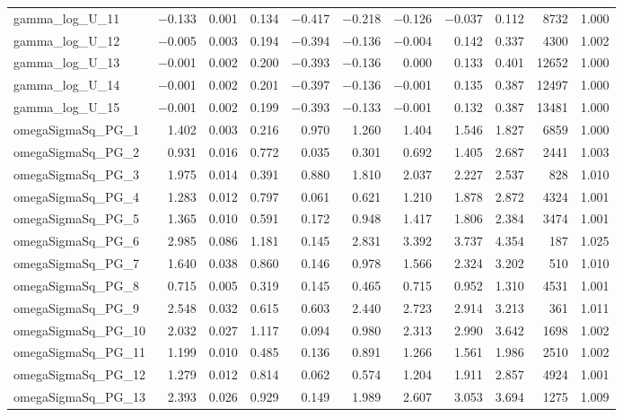 \documentclass[12pt]{article}
\begin{document}
\begin{longtable}{lrrrrrrrrrr}
gamma\_log\_U\_11 & $-$0.133 & 0.001 & 0.134 & $-$0.417 & $-$0.218 & $-$0.126 & $-$0.037 &  0.112 &  8732 & 1.000 \\
gamma\_log\_U\_12 & $-$0.005 & 0.003 & 0.194 & $-$0.394 & $-$0.136 & $-$0.004 &  0.142 &  0.337 &  4300 & 1.002 \\
gamma\_log\_U\_13 & $-$0.001 & 0.002 & 0.200 & $-$0.393 & $-$0.136 &  0.000 &  0.133 &  0.401 & 12652 & 1.000 \\
gamma\_log\_U\_14 & $-$0.001 & 0.002 & 0.201 & $-$0.397 & $-$0.136 & $-$0.001 &  0.135 &  0.387 & 12497 & 1.000 \\
gamma\_log\_U\_15 & $-$0.001 & 0.002 & 0.199 & $-$0.393 & $-$0.133 & $-$0.001 &  0.132 &  0.387 & 13481 & 1.000 \\
\addlinespace
omegaSigmaSq\_PG\_1   & 1.402 & 0.003 & 0.216 & 0.970 & 1.260 & 1.404 & 1.546 & 1.827 &  6859 & 1.000 \\
omegaSigmaSq\_PG\_2   & 0.931 & 0.016 & 0.772 & 0.035 & 0.301 & 0.692 & 1.405 & 2.687 &  2441 & 1.003 \\
omegaSigmaSq\_PG\_3   & 1.975 & 0.014 & 0.391 & 0.880 & 1.810 & 2.037 & 2.227 & 2.537 &   828 & 1.010 \\
omegaSigmaSq\_PG\_4   & 1.283 & 0.012 & 0.797 & 0.061 & 0.621 & 1.210 & 1.878 & 2.872 &  4324 & 1.001 \\
omegaSigmaSq\_PG\_5   & 1.365 & 0.010 & 0.591 & 0.172 & 0.948 & 1.417 & 1.806 & 2.384 &  3474 & 1.001 \\
omegaSigmaSq\_PG\_6   & 2.985 & 0.086 & 1.181 & 0.145 & 2.831 & 3.392 & 3.737 & 4.354 &   187 & 1.025 \\
omegaSigmaSq\_PG\_7   & 1.640 & 0.038 & 0.860 & 0.146 & 0.978 & 1.566 & 2.324 & 3.202 &   510 & 1.010 \\
omegaSigmaSq\_PG\_8   & 0.715 & 0.005 & 0.319 & 0.145 & 0.465 & 0.715 & 0.952 & 1.310 &  4531 & 1.001 \\
omegaSigmaSq\_PG\_9   & 2.548 & 0.032 & 0.615 & 0.603 & 2.440 & 2.723 & 2.914 & 3.213 &   361 & 1.011 \\
omegaSigmaSq\_PG\_10  & 2.032 & 0.027 & 1.117 & 0.094 & 0.980 & 2.313 & 2.990 & 3.642 &  1698 & 1.002 \\
omegaSigmaSq\_PG\_11  & 1.199 & 0.010 & 0.485 & 0.136 & 0.891 & 1.266 & 1.561 & 1.986 &  2510 & 1.002 \\
omegaSigmaSq\_PG\_12  & 1.279 & 0.012 & 0.814 & 0.062 & 0.574 & 1.204 & 1.911 & 2.857 &  4924 & 1.001 \\
omegaSigmaSq\_PG\_13  & 2.393 & 0.026 & 0.929 & 0.149 & 1.989 & 2.607 & 3.053 & 3.694 &  1275 & 1.009 \\

\end{longtable}
\end{document}
